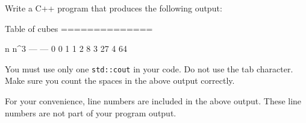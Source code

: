 Write a C++ program that produces the following output:
\begin{console}[numbers=left]
Table of cubes
==============

n       n^3
---     ---
0       0
1       1
2       8
3       27
4       64

\end{console}
You must use only one 
\verb!std::cout! in your code. 
Do not use the tab character. 
Make sure you count the spaces in the above output correctly.

For your convenience, line numbers are included in the above output.
These line numbers are not part of your program output.

